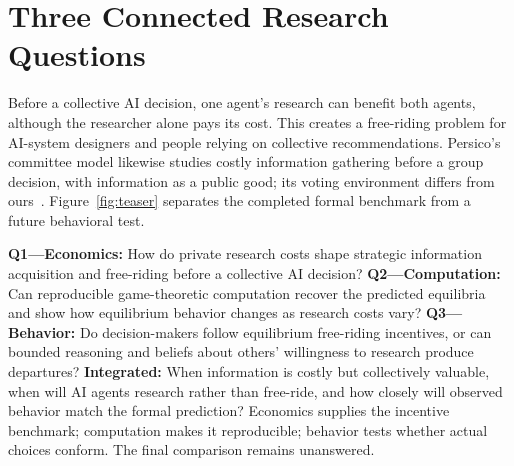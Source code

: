 \section{Three Connected Research Questions}
Before a collective AI decision, one agent's research can benefit both agents, although the researcher alone pays its cost. This creates a free-riding problem for AI-system designers and people relying on collective recommendations. Persico's committee model likewise studies costly information gathering before a group decision, with information as a public good; its voting environment differs from ours~\cite{persico2004}. Figure~\ref{fig:teaser} separates the completed formal benchmark from a future behavioral test.

\noindent\textbf{Q1---Economics:} How do private research costs shape strategic information acquisition and free-riding before a collective AI decision?
\textbf{Q2---Computation:} Can reproducible game-theoretic computation recover the predicted equilibria and show how equilibrium behavior changes as research costs vary?
\textbf{Q3---Behavior:} Do decision-makers follow equilibrium free-riding incentives, or can bounded reasoning and beliefs about others' willingness to research produce departures?
\textbf{Integrated:} When information is costly but collectively valuable, when will AI agents research rather than free-ride, and how closely will observed behavior match the formal prediction?
Economics supplies the incentive benchmark; computation makes it reproducible; behavior tests whether actual choices conform. The final comparison remains unanswered.
